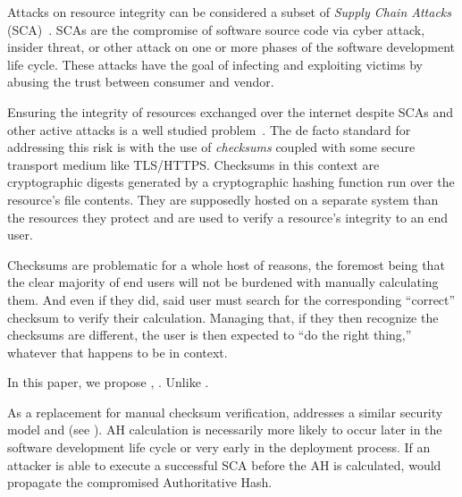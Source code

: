 Attacks on resource integrity can be considered a subset of \emph{Supply Chain
Attacks} (SCA)~\cite{SCA}. SCAs are the compromise of software source code via
cyber attack, insider threat, or other attack on one or more phases of the
software development life cycle. These attacks have the goal of infecting and
exploiting victims by abusing the trust between consumer and vendor.


Ensuring the integrity of resources exchanged over the internet despite SCAs and
other active attacks is a well studied problem~\cite{MD5Header, HTTP1.1, HTTPS,
SRI, LF, OpenPGP1, DNSSEC, PKI}. The de facto standard for addressing this risk
is with the use of \textit{checksums} coupled with some secure transport medium
like TLS/HTTPS. Checksums in this context are cryptographic digests generated by
a cryptographic hashing function run over the resource's file contents. They are
supposedly hosted on a separate system than the resources they protect and are
used to verify a resource’s integrity to an end user.



Checksums are problematic for a whole host of reasons, the foremost being that
the clear majority of end users will not be burdened with manually calculating
them. And even if they did, said user must search for the corresponding
``correct'' checksum to verify their calculation. Managing that, if they then
recognize the checksums are different, the user is then expected to ``do the
right thing,'' whatever that happens to be in context.


In this paper, we propose \SYSTEM{}, . Unlike .

As a replacement for manual checksum verification, \SYSTEM{} addresses a similar
security model and (see ). AH calculation is necessarily more
likely to occur later in the software development life cycle or very early in
the deployment process. If an attacker is able to execute a successful SCA
before the AH is calculated, \SYSTEM{} would propagate the compromised
Authoritative Hash.


